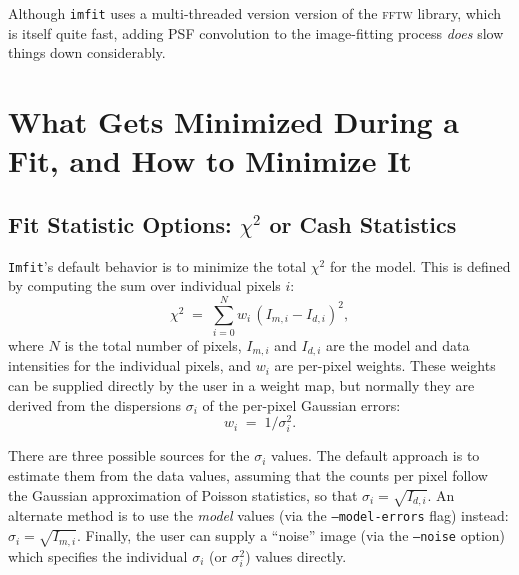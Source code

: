 \documentclass[10pt,a4paper,article]{memoir}
\newcommand{\imfit}{\texttt{imfit}}
\newcommand{\Imfit}{\texttt{Imfit}}
\newcommand{\chisquare}{\ensuremath{\chi^{2}}}
\begin{document}
Although \imfit{} uses a multi-threaded version version of the \textsc{fftw} library, which
is itself quite fast, adding PSF convolution to the image-fitting process \textit{does}
slow things down considerably.



\chapter{What Gets Minimized During a Fit, and How to Minimize It}

\section{Fit Statistic Options: \chisquare{} or Cash Statistics}\label{sec:fit-statistics}

\Imfit's default behavior is to minimize the total \chisquare{} for the model. This
is defined by computing the sum over individual pixels $i$:
\begin{equation}
\chisquare \; = \; \sum_{i = 0}^{N} w_{i} \, (I_{m, i} - I_{d, i})^2 ,
\end{equation}
where $N$ is the total number of pixels, $I_{m, i}$ and $I_{d, i}$ are the model and data intensities
for the individual pixels, and $w_{i}$ are per-pixel weights. These weights can be
supplied directly by the user in a weight map, but normally they are derived from the
dispersions $\sigma_{i}$ of the per-pixel Gaussian errors:
\begin{equation}
w_{i} \; = \; 1/\sigma_{i}^{2} .
\end{equation}

There are three possible sources for the $\sigma_{i}$ values. The
default approach is to estimate them from the data values, assuming that
the counts per pixel follow the Gaussian approximation of Poisson
statistics, so that $\sigma_{i} = \sqrt{I_{d,i}}$. An alternate method
is to use the \textit{model} values (via the \texttt{--model-errors}
flag) instead: $\sigma_{i} = \sqrt{I_{m,i}}$. Finally, the user can
supply a ``noise'' image (via the \texttt{--noise} option) which
specifies the individual $\sigma_{i}$ (or $\sigma_{i}^{2}$) values
directly.
\end{document}
